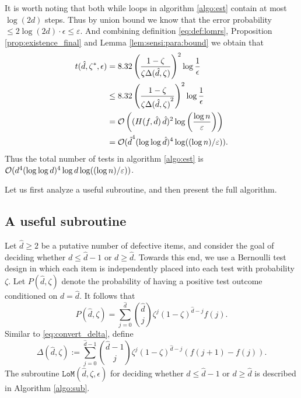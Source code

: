 \documentclass[onecolumn,letterpaper]{IEEEtran}
\newcommand{\cO}{{\cal O}}
\newcommand{\lom}{{\texttt{LoM}}}
\newcommand{\lomerr}{{\epsilon}}
\newcommand{\ud}{{\hat{d}}}
\newcommand{\lomp}{{P}}
\newcommand{\lomcp}{{\zeta}}
\newcommand{\lompp}{{\lomp(\ud,\lomcp)}}
\newcommand{\lompgap}{{\Delta(\ud,\lomcp)}}
\newcommand{\esterr}{{\varepsilon}}
\newcommand{\lomcps}{{\lomcp^*}}
\newcommand{\lomrss}{{t(\ud,\lomcps,\lomerr)}}
\begin{document}
It is worth noting that both while loops in algorithm \ref{algo:est} contain at most $\log (2d)$ steps. Thus by union bound we know that the error probability $\le 2 \log (2d) \cdot \lomerr \le \esterr$. And combining definition \eqref{eq:def:lomrs}, Proposition \ref{prop:existence_final} and Lemma \ref{lem:sensi:para:bound} we obtain that 
\begin{align*}
    \lomrss &= 8.32 \left( \frac{1-\lomcp}{\lomcp \lompgap} \right)^2 \log \frac{1}{\lomerr} \\ 
    &\le 8.32 \left( \frac{1-\lomcp}{\lomcp \lompgap^2} \right)^2 \log \frac{1}{\lomerr} \\ 
    &= \cO \left( ( H(f,\ud) \, \ud )^2 \log \left( \frac{\log n}{\esterr} \right) \right) \\ 
    &= \cO (\ud^4 (\log\log \ud)^4 \log((\log n) / \esterr )).
\end{align*}
Thus the total number of tests in algorithm \ref{algo:est} is $\cO (d^4 (\log\log d)^4 \log d \log((\log n) / \esterr ))$.





\fi















Let us first analyze a useful subroutine, and then present the full algorithm.

\subsection{A useful subroutine}
Let $\ud \geq 2$ be a putative number of defective items, and consider the goal of deciding whether $d \le \ud-1$ or $d \ge \ud$. Towards this end, we use a Bernoulli test design in which each item is independently placed into each test with probability $\lomcp$. Let $\lompp$ denote the probability of having a positive test outcome conditioned on $d=\ud$. It follows that
\begin{equation} \label{eq:lompp}
    \lompp = \sum\limits_{j=0}^{\ud} \binom{\ud}{j} \lomcp^j (1-\lomcp)^{\ud-j} f(j).
\end{equation}
Similar to \eqref{eq:convert_delta}, define
\begin{equation} \label{eq:def:lompgap}
    \lompgap := \sum\limits_{j=0}^{\ud-1} \binom{\ud-1}{j} \lomcp^j (1-\lomcp)^{\ud-j} \left(f(j+1) - f(j)\right).
\end{equation}
The subroutine $\lom(\ud,\lomcp,\lomerr)$ for deciding whether $d \le \ud-1$ or $d \ge \ud$ is described in Algorithm \ref{algo:sub}.
\end{document}
